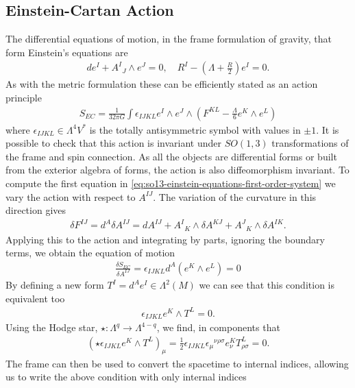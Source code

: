 \documentclass[10pt]{report}
\theoremstyle{definition}
\begin{document}
\subsection{Einstein-Cartan Action}
The differential equations of motion, in the frame formulation of gravity, that form Einstein's equations are
\begin{align}
    d e^I + A^I{}_J \wedge e^J = 0, \quad R^I - \left(\Lambda + \frac{R}{2} \right) e^I = 0. \label{eq:so13-einstein-equations-first-order-system}
\end{align}
As with the metric formulation these can be efficiently stated as an action principle
\begin{align}\label{eq:einstein-cartan-action}
    S_{EC} = \frac{1}{32\pi G}\int \epsilon_{IJKL} e^I \wedge e^J \wedge \left( F^{KL} - \frac{\Lambda}{6} e^K \wedge e^L \right)
\end{align}
where $\epsilon_{IJKL} \in \Lambda^4 V^*$ is the totally antisymmetric symbol with values in $\pm 1$. It is possible to check that this action is invariant under $SO(1,3)$ transformations of the frame and spin connection. As all the objects are differential forms or built from the exterior algebra of forms, the action is also diffeomorphism invariant. To compute the first equation in \cref{eq:so13-einstein-equations-first-order-system} we vary the action with respect to $A^{IJ}$. The variation of the curvature in this direction gives 
\begin{align}
    \delta F^{IJ} = d^A \delta A^{IJ} = d A^{IJ} + A^I{}_K \wedge \delta A^{KJ} + A^J{}_K \wedge \delta A^{IK}.
\end{align}
Applying this to the action and integrating by parts, ignoring the boundary terms, we obtain the equation of motion 
\begin{align}
    \frac{\delta S_{EC}}{\delta A^{IJ}} = \epsilon_{IJKL} d^A \left( e^K \wedge e^L \right) = 0
\end{align}
By defining a new form $T^I = d^A e^I \in \Lambda^2(M)$ we can see that this condition is equivalent too 
\begin{align}
    \epsilon_{IJKL} e^K \wedge T^L = 0.
\end{align}
Using the Hodge star, $\star : \Lambda^q \rightarrow \Lambda^{4-q}$, we find, in  components that 
\begin{align}
    (\star \epsilon_{IJKL} e^K \wedge T^L)_\mu = \frac{1}{2} \epsilon_{IJKL} \epsilon_\mu{}^{\nu\rho\sigma} e^K_\nu T^L_{\rho\sigma} = 0.
\end{align}
The frame can then be used to convert the spacetime to internal indices, allowing us to write the above condition with only internal indices
\end{document}
